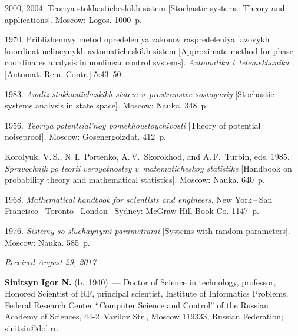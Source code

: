   \begin{multicols}{2}

\renewcommand{\bibname}{\protect\rmfamily References}

{\small\frenchspacing
 {%
 \begin{thebibliography}{9}
 2000, 2004.
Teoriya stokhasticheskikh sistem [Stochastic systems: Theory and  applications]. 
Moscow: Logos. 1000~p.  %


 1970.
Priblizhennyy metod opredeleniya zakonov raspredeleniya fazovykh koordinat 
nelineynykh avtomaticheskikh sistem [Approximate method for phase coordinates 
analysis in nonlinear control systems]. 
\textit{Avtomatika i~telemekhanika} [Automat. Rem. Contr.]
5:43--50.

 1983.
\textit{Analiz sto\-kha\-sti\-che\-skikh sistem v~prostranstve sostoyaniy} [Stochastic 
systems analysis in state space]. Moscow: Nauka. 348~p.

 1956.
\textit{Teoriya potentsial'noy po\-me\-kho\-us\-toy\-chi\-vosti} [Theory of potential noiseproof]. 
Moscow: Gosenergoizdat. 412~p.

Korolyuk, V.\,S., N.\,I.~Portenko, A.\,V.~Skorokhod, and A.\,F.~Turbin, eds. 1985.
\textit{Spravochnik po teorii veroyatnostey v~matematicheskoy statistike}
[Handbook on probability theory and mathematical statistics]. 
 Moscow: Nauka. 640~p.

 1968.
\textit{Mathematical handbook for scientists and engineers}. 
New York\,--\,San Francisco\,--\,Toronto\,--\,London\,--\,Sydney:
McGraw Hill Book Co. 1147~p.

 1976.
\textit{Sistemy so sluchaynymi parametrami} [Systems with random parameters]. Moscow:
Nauka.  585~p.
\end{thebibliography}

 }
 }

\end{multicols}

\vspace*{-6pt}

\hfill{\small\textit{Received August 29, 2017}}

  

\Contrl

\noindent
\textbf{Sinitsyn Igor N.} (b.\ 1940)~--- 
Doctor of Science in technology, professor, Honored Scientist of RF, 
principal scientist, Institute of Informatics Problems, Federal Research 
Center ``Computer Science and Control'' of the Russian Academy of Sciences, 
44-2~Vavilov Str., Moscow 119333, Russian Federation; \mbox{sinitsin@dol.ru}
\label{end\stat}


\renewcommand{\bibname}{\protect\rm Литература} 